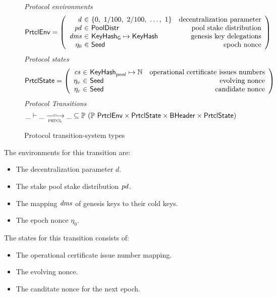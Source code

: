 \begin{figure}
  \emph{Protocol environments}
  \begin{equation*}
    \PrtclEnv =
    \left(
      \begin{array}{r@{~\in~}lr}
        \var{d} & \{0,~1/100,~2/100,~\ldots,~1\} & \text{decentralization parameter} \\
        \var{pd} & \PoolDistr & \text{pool stake distribution} \\
        \var{dms} & \KeyHashGen\mapsto\KeyHash & \text{genesis key delegations} \\
        \eta_0 & \Seed & \text{epoch nonce} \\
      \end{array}
    \right)
  \end{equation*}
  \emph{Protocol states}
  \begin{equation*}
    \PrtclState =
    \left(
      \begin{array}{r@{~\in~}lr}
        \var{cs} & \KeyHash_{pool} \mapsto \N & \text{operational certificate issues numbers} \\
        \eta_v & \Seed & \text{evolving nonce} \\
        \eta_c & \Seed & \text{candidate nonce} \\
      \end{array}
    \right)
  \end{equation*}
  \emph{Protocol Transitions}
  \begin{equation*}
    \_ \vdash \var{\_} \trans{prtcl}{\_} \var{\_} \subseteq
    \powerset (\powerset{\PrtclEnv} \times \PrtclState \times \BHeader \times \PrtclState)
  \end{equation*}
  \caption{Protocol transition-system types}
  \label{fig:ts-types:prtcl}
\end{figure}

The environments for this transition are:
\begin{itemize}
  \item The decentralization parameter $d$.
  \item The stake pool stake distribution $\mathit{pd}$.
  \item The mapping $\mathit{dms}$ of genesis keys to their cold keys.
  \item The epoch nonce $\eta_0$.
\end{itemize}

The states for this transition consists of:
\begin{itemize}
  \item The operational certificate issue number mapping.
  \item The evolving nonce.
  \item The canditate nonce for the next epoch.
\end{itemize}

